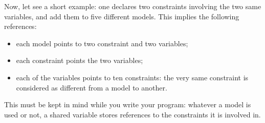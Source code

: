 Now, let see a short example: one declares two constraints involving the two same variables, and add them to five different models. This implies the following references:
\begin{itemize}
\item each model points to two constraint and two variables;
\item each constraint points the two variables;
\item each of the variables points to ten constraints: the very same constraint is considered as different from a model to another.  
\end{itemize}

This must be kept in mind while you write your program: whatever a model is used or not, a shared variable stores references to the constraints it is involved in. 

